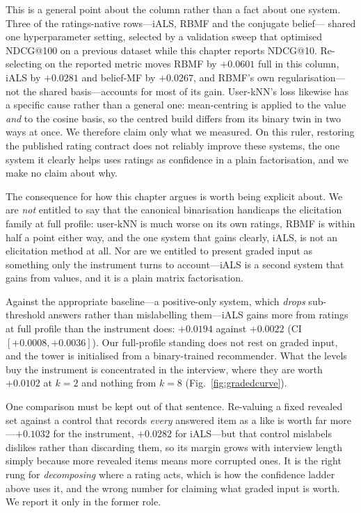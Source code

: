 \documentclass[11pt]{article}
\begin{document}
This is a general point about the column rather than a fact about one system. Three of the ratings-native rows---iALS, RBMF and the conjugate belief---
shared one hyperparameter setting, selected by a validation sweep that optimised NDCG@100 on a previous
dataset while this chapter reports NDCG@10. Re-selecting on the reported metric moves RBMF by $+0.0601$
full in this column, iALS by $+0.0281$ and belief-MF by $+0.0267$, and RBMF's own regularisation---not the
shared basis---accounts for most of its gain. User-kNN's loss likewise has a specific cause rather than a
general one: mean-centring is applied to the value \emph{and} to the cosine basis, so the centred build
differs from its binary twin in two ways at once. We therefore claim only what we measured. On this ruler,
restoring the published rating contract does not reliably improve these systems, the one system it clearly
helps uses ratings as confidence in a plain factorisation, and we make no claim about why.

The consequence for how this chapter argues is worth being explicit about. We are \emph{not} entitled to
say that the canonical binarisation handicaps the elicitation family at full profile: user-kNN is much
worse on its own ratings, RBMF is within half a point either way, and the one system that gains
clearly, iALS, is not an elicitation method at all. Nor are we entitled to present graded input as something only the instrument
turns to account---iALS is a second system that gains from values, and it is a plain matrix factorisation.

Against the appropriate baseline---a positive-only system, which \emph{drops} sub-threshold answers rather than
mislabelling them---iALS gains more from ratings at full profile than the instrument does: $+0.0194$
against $+0.0022$ (CI $[+0.0008,+0.0036]$). Our full-profile standing does not rest on graded input, and
the tower is initialised from a binary-trained recommender. What the levels buy the instrument is
concentrated in the interview, where they are worth $+0.0102$ at $k{=}2$ and nothing from $k{=}8$
(Fig.~\ref{fig:gradedcurve}).

One comparison must be kept out of that sentence. Re-valuing a fixed revealed set against a control that
records \emph{every} answered item as a like is worth far more---$+0.1032$ for the instrument, $+0.0282$
for iALS---but that control mislabels dislikes rather than discarding them, so its margin grows with
interview length simply because more revealed items means more corrupted ones. It is the right rung for
\emph{decomposing} where a rating acts, which is how the confidence ladder above uses it, and the wrong
number for claiming what graded input is worth. We report it only in the former role.
\end{document}
